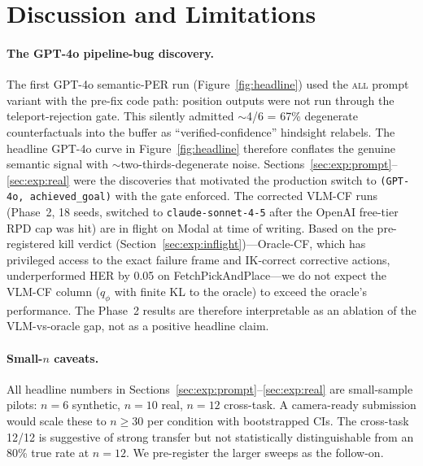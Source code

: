 \documentclass{article}
\begin{document}
\section{Discussion and Limitations}
\label{sec:discussion}

\paragraph{The GPT-4o pipeline-bug discovery.}
The first GPT-4o semantic-PER run (Figure~\ref{fig:headline}) used the
\textsc{all} prompt variant with the pre-fix code path: position outputs were
not run through the teleport-rejection gate. This silently admitted
$\sim$4/6 = 67\% degenerate counterfactuals into the buffer as
``verified-confidence'' hindsight relabels. The headline GPT-4o curve in
Figure~\ref{fig:headline} therefore conflates the genuine semantic signal with
$\sim$two-thirds-degenerate noise. Sections~\ref{sec:exp:prompt}--\ref{sec:exp:real}
were the discoveries that motivated the production switch to
\texttt{(GPT-4o, achieved\_goal)} with the gate enforced.
The corrected VLM-CF runs (Phase~2, 18 seeds, switched to
\texttt{claude-sonnet-4-5} after the OpenAI free-tier RPD cap was hit)
are in flight on Modal at time of writing. Based on the pre-registered
kill verdict (Section~\ref{sec:exp:inflight})---Oracle-CF, which has
privileged access to the exact failure frame and IK-correct corrective
actions, underperformed HER by 0.05 on FetchPickAndPlace---we do not
expect the VLM-CF column ($q_\phi$ with finite KL to the oracle) to
exceed the oracle's performance. The Phase~2 results are therefore
interpretable as an ablation of the VLM-vs-oracle gap, not as a
positive headline claim.

\paragraph{Small-$n$ caveats.}
All headline numbers in Sections~\ref{sec:exp:prompt}--\ref{sec:exp:real} are
small-sample pilots: $n\!=\!6$ synthetic, $n\!=\!10$ real, $n\!=\!12$
cross-task. A camera-ready submission would scale these to $n\!\ge\!30$ per
condition with bootstrapped CIs. The cross-task 12/12 is suggestive of strong
transfer but not statistically distinguishable from an 80\% true rate at
$n\!=\!12$. We pre-register the larger sweeps as the follow-on.
\end{document}
